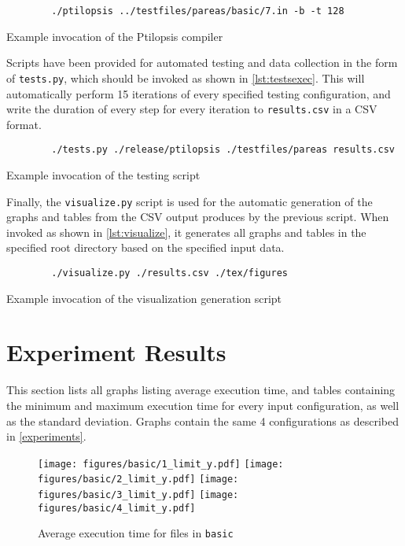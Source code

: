 \documentclass[12pt,dvipsnames]{article}
\newcommand{\mono}[1]{\texttt{#1}}
\begin{document}
\begin{listing}[h]
    \begin{verbatim}
        ./ptilopsis ../testfiles/pareas/basic/7.in -b -t 128
    \end{verbatim}
    \caption{Example invocation of the Ptilopsis compiler}
    \label{lst:examplerun}
\end{listing}

Scripts have been provided for automated testing and data collection in the form of \mono{tests.py}, which should be invoked as shown in \autoref{lst:testsexec}. This will automatically perform 15 iterations of every specified testing configuration, and write the duration of every step for every iteration to \mono{results.csv} in a CSV format.

\begin{listing}[h]
    \begin{verbatim}
        ./tests.py ./release/ptilopsis ./testfiles/pareas results.csv
    \end{verbatim}
    \caption{Example invocation of the testing script}
    \label{lst:testsexec}
\end{listing}

Finally, the \mono{visualize.py} script is used for the automatic generation of the graphs and tables from the CSV output produces by the previous script. When invoked as shown in \autoref{lst:visualize}, it generates all graphs and tables in the specified root directory based on the specified input data.

\begin{listing}[h]
   \begin{verbatim}
        ./visualize.py ./results.csv ./tex/figures
   \end{verbatim}
   \caption{Example invocation of the visualization generation script}
   \label{lst:visualize}
\end{listing}

\newpage
\section{Experiment Results} \label{results}
This section lists all graphs listing average execution time, and tables containing the minimum and maximum execution time for every input configuration, as well as the standard deviation. Graphs contain the same 4 configurations as described in \autoref{experiments}.

\begin{figure}[ht]
    \centering
    \texttt{[image: figures/basic/1\_limit\_y.pdf]}
    \texttt{[image: figures/basic/2\_limit\_y.pdf]}
    \texttt{[image: figures/basic/3\_limit\_y.pdf]}
    \texttt{[image: figures/basic/4\_limit\_y.pdf]}
    \caption{Average execution time for files in \mono{basic} }
    \label{fig:results_basic_a}
\end{figure}
\end{document}
